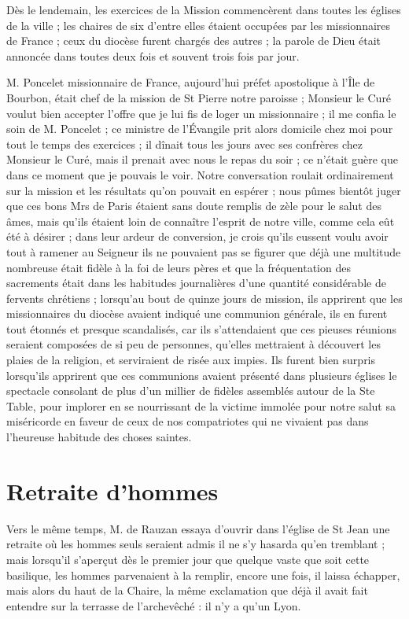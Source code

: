 \documentclass[11pt,a4paper]{report}
\begin{document}
Dès le lendemain, les exercices de la Mission commencèrent dans toutes les églises de la ville ; les chaires de six d'entre elles étaient occupées par les missionnaires de France ; ceux du diocèse furent chargés des autres ; la parole de Dieu était annoncée dans toutes deux fois et souvent trois fois par jour.

M. Poncelet missionnaire de France, aujourd'hui préfet apostolique à l'Île de Bourbon, était chef de la mission de St Pierre notre paroisse ; Monsieur le Curé voulut bien accepter l'offre que je lui fis de loger un missionnaire ; il me confia le soin de M. Poncelet ; ce ministre de l'Évangile prit alors domicile chez moi pour tout le temps des exercices ; il dînait tous les jours avec ses confrères chez Monsieur le Curé, mais il prenait avec nous le repas du soir ; ce n'était guère que dans ce moment que je pouvais le voir. Notre conversation roulait ordinairement sur la mission et les résultats qu'on pouvait en espérer ; nous pûmes bientôt juger que ces bons Mrs de Paris étaient sans doute remplis de zèle pour le salut des âmes, mais qu'ils étaient loin de connaître l'esprit de notre ville, comme cela eût été à désirer ; dans leur ardeur de conversion, je crois qu'ils eussent voulu avoir tout à ramener au Seigneur ils ne pouvaient pas se figurer que déjà une multitude nombreuse était fidèle à la foi de leurs pères et que la fréquentation des sacrements était dans les habitudes journalières d'une quantité considérable de fervents chrétiens ; lorsqu'au bout de quinze jours de mission, ils apprirent que les missionnaires du diocèse avaient indiqué une communion générale, ils en furent tout étonnés et presque scandalisés, car ils s'attendaient que ces pieuses réunions seraient composées de si peu de personnes, qu'elles mettraient à découvert les plaies de la religion, et serviraient de risée aux impies. Ils furent bien surpris lorsqu'ils apprirent que ces communions avaient présenté dans plusieurs églises le spectacle consolant de plus d'un millier de fidèles assemblés autour de la Ste Table, pour implorer en se nourrissant de la victime immolée pour notre salut sa miséricorde en faveur de ceux de nos compatriotes qui ne vivaient pas dans l'heureuse habitude des choses saintes.

\section*{Retraite d'hommes}

Vers le même temps, M. de Rauzan essaya d'ouvrir dans l'église de St Jean une retraite où les hommes seuls seraient admis il ne s'y hasarda qu'en tremblant ; mais lorsqu'il s'aperçut dès le premier jour que quelque vaste que soit cette basilique, les hommes parvenaient à la remplir, encore une fois, il laissa échapper, mais alors du haut de la Chaire, la même exclamation que déjà il avait fait entendre sur la terrasse de l'archevêché : il n'y a qu'un Lyon.
\end{document}

